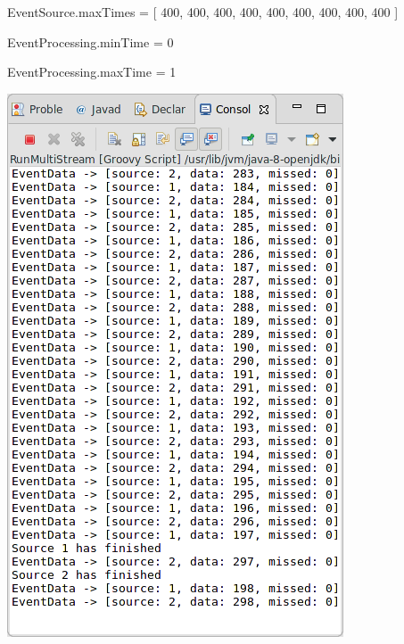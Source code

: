 EventSource.maxTimes = [ 400, 400, 400, 400, 400, 400, 400, 400, 400 ]

EventProcessing.minTime = 0

EventProcessing.maxTime = 1

\includegraphics[width=\textwidth/2]{img/screenshots/9-2-3.png}
